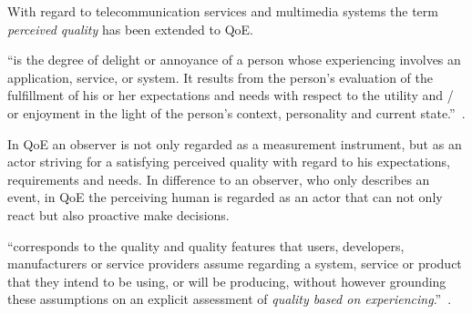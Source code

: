 With regard to telecommunication services and multimedia systems the term \emph{perceived quality} has been extended to \acf{QoE}.
\begin{definition}
``is the degree of delight or annoyance of a person whose experiencing involves an application, service, or system.
It results from the person’s evaluation of the fulfillment of his or her expectations and needs with respect to the utility and / or enjoyment in the light of the person’s context, personality and current state.''~\citep[p. 21]{moller_quality_2014}.
\end{definition}

In \ac{QoE} an observer is not only regarded as a measurement instrument, but as an actor striving for a   satisfying perceived quality with regard to his expectations, requirements and needs.
In difference to an observer, who only describes an event, in QoE the perceiving human is regarded as an actor that can not only react but also proactive make decisions.

\begin{definition}
``corresponds to the quality and quality features that users, developers, manufacturers or  service  providers assume regarding a  system, service or product that they intend to be using, or will be producing, without however grounding these assumptions on an explicit assessment of \textit{quality based on experiencing}.''~\citep[p. 20]{moller_quality_2014}.
\end{definition}











